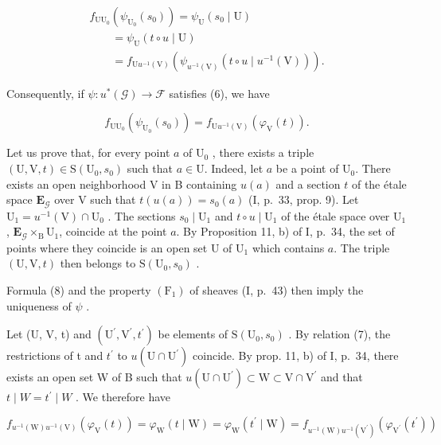 \[
\begin{array}{l} f_{\mathrm{U}\mathrm{U}_{0}}(\psi_{\mathrm{U}_{0}}(s_{0})) = \psi_{\mathrm{U}}(s_{0} \mid \mathrm{U}) \\ \qquad = \psi_{\mathrm{U}}(t \circ u \mid \mathrm{U}) \\ \qquad = f_{\mathrm{U}u^{-1}(\mathrm{V})}(\psi_{u^{-1}(\mathrm{V})}(t \circ u \mid u^{-1}(\mathrm{V}))). \end{array}
\]

Consequently, if \(\psi \colon u^{*}(\mathcal{G})\to \mathcal{F}\) satisfies (6), we have

\[
f_{\mathrm{U}\mathrm{U}_{0}}(\psi_{\mathrm{U}_{0}}(s_{0})) = f_{\mathrm{U}u^{-1}(\mathrm{V})}(\varphi_{\mathrm{V}}(t)).\tag{8}
\]

Let us prove that, for every point \(a\) of \(\mathrm{U}_0\) , there exists a triple \((\mathrm{U},\mathrm{V},t)\in \mathrm{S}(\mathrm{U}_0,s_0)\) such that \(a\in \mathrm{U}\). Indeed, let \(a\) be a point of \(\mathrm{U}_0\). There exists an open neighborhood V in B containing \(u(a)\) and a section \(t\) of the étale space \(\mathbf{E}_{\mathcal{G}}\) over V such that \(t(u(a)) = s_0(a)\) (I, p.~33, prop. 9). Let \(\mathrm{U}_1 = u^{-1} (\mathrm{V})\cap \mathrm{U}_0\) . The sections \(s_0\mid \mathrm{U}_1\) and \(t\circ u\mid \mathrm{U}_1\) of the étale space over \(\mathrm{U}_1\), \(\mathbf{E}_{\mathcal{G}}\times_{\mathrm{B}}\mathrm{U}_1\), coincide at the point \(a\). By Proposition 11, b) of I, p.~34, the set of points where they coincide is an open set U of \(\mathrm{U}_1\) which contains \(a\). The triple \((\mathrm{U},\mathrm{V},t)\) then belongs to \(\mathrm{S}(\mathrm{U}_0,s_0)\) .

Formula (8) and the property \((\mathrm{F}_{1})\) of sheaves (I, p.~43) then imply the uniqueness of \(\psi\) .

Let (U, V, t) and \((\mathrm{U}^{\prime}, \mathrm{V}^{\prime}, t^{\prime})\) be elements of \(\mathrm{S}(\mathrm{U}_{0}, s_{0})\) . By relation (7), the restrictions of t and \(t^{\prime}\) to \(u(\mathrm{U} \cap \mathrm{U}^{\prime})\) coincide. By prop. 11, b) of I, p.~34, there exists an open set W of B such that \(u(\mathrm{U} \cap \mathrm{U}^{\prime}) \subset \mathrm{W} \subset \mathrm{V} \cap \mathrm{V}^{\prime}\) and that \(t \mid W = t^{\prime} \mid W\) . We therefore have

\[
f_{u^{-1}(\mathrm{W})u^{-1}(\mathrm{V})}(\varphi_{\mathrm{V}}(t)) = \varphi_{\mathrm{W}}(t\mid \mathrm{W}) = \varphi_{\mathrm{W}}(t^{\prime}\mid \mathrm{W}) = f_{u^{-1}(\mathrm{W})u^{-1}(\mathrm{V}^{\prime})}(\varphi_{\mathrm{V}^{\prime}}(t^{\prime}))
\]


